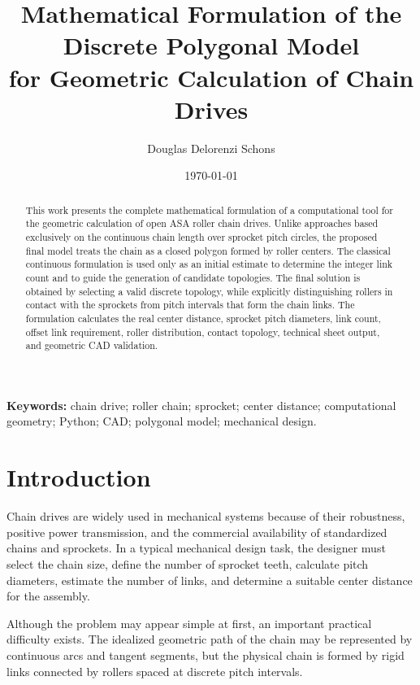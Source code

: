 \documentclass[12pt,a4paper]{article}
\title{
    Mathematical Formulation of the Discrete Polygonal Model\\
    for Geometric Calculation of Chain Drives
}
\author{Douglas Delorenzi Schons}
\date{\today}
\begin{document}
\maketitle

\begin{abstract}
This work presents the complete mathematical formulation of a computational tool for the geometric calculation of open ASA roller chain drives. Unlike approaches based exclusively on the continuous chain length over sprocket pitch circles, the proposed final model treats the chain as a closed polygon formed by roller centers. The classical continuous formulation is used only as an initial estimate to determine the integer link count and to guide the generation of candidate topologies. The final solution is obtained by selecting a valid discrete topology, while explicitly distinguishing rollers in contact with the sprockets from pitch intervals that form the chain links. The formulation calculates the real center distance, sprocket pitch diameters, link count, offset link requirement, roller distribution, contact topology, technical sheet output, and geometric CAD validation.
\end{abstract}

\textbf{Keywords:} chain drive; roller chain; sprocket; center distance; computational geometry; Python; CAD; polygonal model; mechanical design.

\newpage
\tableofcontents
\newpage

\section{Introduction}

Chain drives are widely used in mechanical systems because of their robustness, positive power transmission, and the commercial availability of standardized chains and sprockets. In a typical mechanical design task, the designer must select the chain size, define the number of sprocket teeth, calculate pitch diameters, estimate the number of links, and determine a suitable center distance for the assembly.

Although the problem may appear simple at first, an important practical difficulty exists. The idealized geometric path of the chain may be represented by continuous arcs and tangent segments, but the physical chain is formed by rigid links connected by rollers spaced at discrete pitch intervals.
\end{document}
